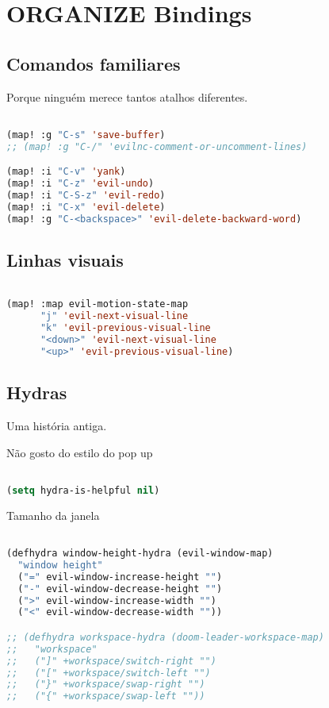 \documentclass[11pt]{article}
\begin{document}
\section{ORGANIZE Bindings}
\label{sec:organize-bindings}


\subsection{Comandos familiares}
\label{sec:comandos-familiares}
Porque ninguém merece tantos atalhos diferentes.

\begin{lstlisting}[language=Lisp]%! Someone please complete this list for me

(map! :g "C-s" 'save-buffer)
;; (map! :g "C-/" 'evilnc-comment-or-uncomment-lines)

(map! :i "C-v" 'yank)
(map! :i "C-z" 'evil-undo)
(map! :i "C-S-z" 'evil-redo)
(map! :i "C-x" 'evil-delete)
(map! :g "C-<backspace>" 'evil-delete-backward-word)
\end{lstlisting}

\subsection{Linhas visuais}
\label{sec:linhas-visuais}
\begin{lstlisting}[language=Lisp]%! Someone please complete this list for me

(map! :map evil-motion-state-map
      "j" 'evil-next-visual-line
      "k" 'evil-previous-visual-line
      "<down>" 'evil-next-visual-line
      "<up>" 'evil-previous-visual-line)
\end{lstlisting}

\subsection{Hydras}
\label{sec:hydras}
Uma história antiga.

Não gosto do estilo do pop up

\begin{lstlisting}[language=Lisp]%! Someone please complete this list for me

(setq hydra-is-helpful nil)
\end{lstlisting}

Tamanho da janela

\begin{lstlisting}[language=Lisp]%! Someone please complete this list for me

(defhydra window-height-hydra (evil-window-map)
  "window height"
  ("=" evil-window-increase-height "")
  ("-" evil-window-decrease-height "")
  (">" evil-window-increase-width "")
  ("<" evil-window-decrease-width ""))

;; (defhydra workspace-hydra (doom-leader-workspace-map)
;;   "workspace"
;;   ("]" +workspace/switch-right "")
;;   ("[" +workspace/switch-left "")
;;   ("}" +workspace/swap-right "")
;;   ("{" +workspace/swap-left ""))
\end{lstlisting}
\end{document}
